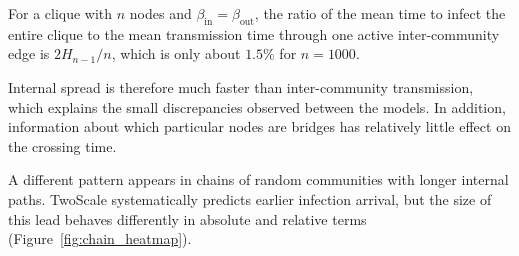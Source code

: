 \documentclass{ieeeaccess}
\newcommand{\TS}{\textup{TwoScale}}
\begin{document}
For a clique with $n$ nodes and $\beta_{\mathrm{in}}=\beta_{\mathrm{out}}$, the ratio of the mean time to infect the entire clique to the mean transmission time through one active inter-community edge is $2H_{n-1}/n$, which is only about $1.5\%$ for $n=1000$.

Internal spread is therefore much faster than inter-community transmission, which explains the small discrepancies observed between the models. In addition, information about which particular nodes are bridges has relatively little effect on the crossing time.

A different pattern appears in chains of random communities with longer internal paths. \TS{} systematically predicts earlier infection arrival, but the size of this lead behaves differently in absolute and relative terms (Figure~\ref{fig:chain_heatmap}).
\end{document}
